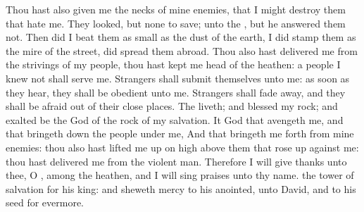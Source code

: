 {Thou hast also
given me the
necks of mine
enemies, that I might
destroy them that
hate me.
They
looked, but
{} none to
save;
{} unto the
{}, but he
answered them not.
Then did I
beat them as small as the
dust of the
earth, I did
stamp them as the
mire of the
street,
{} did spread them
abroad.
Thou also hast
delivered me from the
strivings of my
people, thou hast
kept me
{}
head of the
heathen: a
people
{} I
knew not shall
serve me.
Strangers shall
submit themselves unto me: as soon as they
hear, they shall be
obedient unto me.
Strangers shall fade
away, and they shall be
afraid out of their close
places.
The
{}
liveth; and
blessed
{} my
rock; and
exalted be the
God of the
rock of my
salvation.
It
{}
God that
avengeth me, and that bringeth
down the
people under me,
And that bringeth me
forth from mine
enemies: thou also hast lifted me up on
high above them that rose
up against me: thou hast
delivered me from the
violent
man.
Therefore I will give
thanks unto thee, O
{}, among the
heathen, and I will sing
praises unto thy
name.
 the
tower of
salvation for his
king: and
sheweth
mercy to his
anointed, unto
David, and to his
seed
for
evermore.

}
